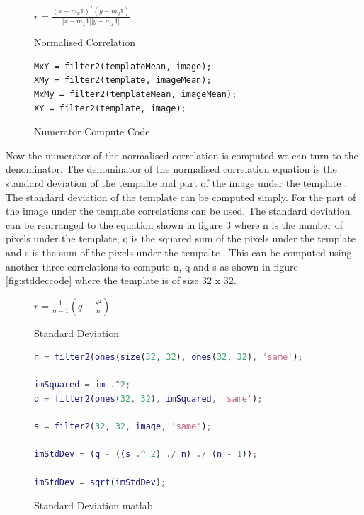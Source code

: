 \documentclass{article}
\begin{document}
\begin{figure}[H]
\begin{center}
$r=\frac{(x-m_x1)^T(y-m_y1)}{|x-m_x1||y-m_x1|}$
\end{center}
\caption{Normalised Correlation}
\label{fig:normcoreq}
\end{figure}

\begin{figure}[H]
\begin{lstlisting}
MxY = filter2(templateMean, image);
XMy = filter2(template, imageMean);
MxMy = filter2(templateMean, imageMean);
XY = filter2(template, image);
\end{lstlisting}
\caption{Numerator Compute Code}
\label{fig:numerator}
\end{figure}

Now the numerator of the normalised correlation is computed we can turn to the
denominator. The denominator of the normalised correlation equation is the
standard deviation of the tempalte and part of the image under the template \cite{crosscor}.
The standard deviation of the template can be computed simply. For the part of the
image under the template correlations can be used. The standard deviation can be
rearranged to the equation shown in figure \ref{fig:normcoreq} where n is the
number of pixels under the template, q is the squared sum of the pixels under the
template and s is the sum of the pixels under the tempalte \cite{stddev}. This can
be computed using another three correlations to compute n, q and s as shown in
figure \ref{fig:stddeccode} where the template is of size 32 x 32.\\

\begin{figure}[H]
\begin{center}
$r=\frac{1}{n - 1}(q - \frac{s^2}{n})$
\end{center}
\caption{Standard Deviation}
\label{fig:normcoreq}
\end{figure}

\begin{figure}[H]
\begin{lstlisting}[language=matlab]
n = filter2(ones(size(32, 32), ones(32, 32), 'same');

imSquared = im .^2;
q = filter2(ones(32, 32), imSquared, 'same');

s = filter2(32, 32, image, 'same');

imStdDev = (q - ((s .^ 2) ./ n) ./ (n - 1));

imStdDev = sqrt(imStdDev);
\end{lstlisting}
\caption{Standard Deviation matlab}
\label{fig{fig:stddeccode}}
\end{figure}
\end{document}
